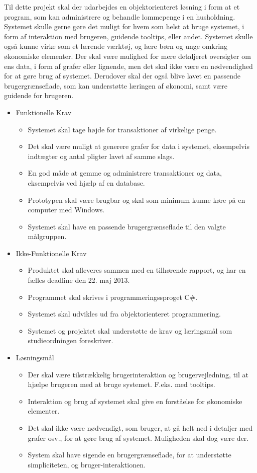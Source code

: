 Til dette projekt skal der udarbejdes en objektorienteret løsning i form at et program, som kan administrere og behandle lommepenge i en husholdning. Systemet skulle gerne gøre det muligt for hvem som helst at bruge systemet, i form af interaktion med brugeren, guidende tooltips, eller andet. Systemet skulle også kunne virke som et lærende værktøj, og lære børn og unge omkring økonomiske elementer. Der skal være mulighed for mere detaljeret oversigter om ens data, i form af grafer eller lignende, men det skal ikke være en nødvendighed for at gøre brug af systemet. Derudover skal der også blive lavet en passende brugergrænseflade, som kan understøtte læringen af økonomi, samt være guidende for brugeren.

\begin{itemize}
	\item Funktionelle Krav
	\begin{itemize}
		\item Systemet skal tage højde for transaktioner af virkelige penge.
		\item Det skal være muligt at generere grafer for data i systemet, eksempelvis indtægter og antal pligter lavet af samme slags.
		\item En god måde at gemme og administrere transaktioner og data, eksempelvis ved hjælp af en database.
		\item Prototypen skal være brugbar og skal som minimum kunne køre på en computer med Windows.
		\item Systemet skal have en passende brugergrænseflade til den valgte målgruppen.
	\end{itemize}
	\item Ikke-Funktionelle Krav
	\begin{itemize}
		\item Produktet skal afleveres sammen med en tilhørende rapport, og har en fælles deadline den 22. maj 2013.
		\item Programmet skal skrives i programmeringssproget C#.
		\item Systemet skal udvikles ud fra objektorienteret programmering.
		\item Systemet og projektet skal understøtte de krav og læringsmål som studieordningen foreskriver.
	\end{itemize}
	\item Løsningsmål
	\begin{itemize}
		\item Der skal være tilstrækkelig brugerinteraktion og brugervejledning, til at hjælpe brugeren med at bruge systemet. F.eks. med tooltips.
		\item Interaktion og brug af systemet skal give en forståelse for økonomiske elementer.
		\item Det skal ikke være nødvendigt, som bruger, at gå helt ned i detaljer med grafer osv., for at gøre brug af systemet. Muligheden skal dog være der.
		\item System skal have sigende en brugergrænseflade, for at understøtte simpliciteten, og bruger-interaktionen.
	\end{itemize}
\end{itemize}
